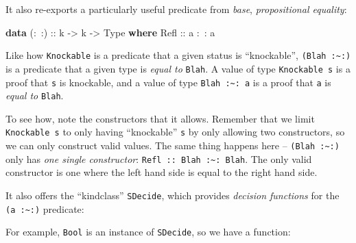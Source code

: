 \documentclass[]{article}
\newenvironment{Shaded}{}{}
\newcommand{\DataTypeTok}[1]{\textcolor[rgb]{0.56,0.13,0.00}{#1}}
\newcommand{\FunctionTok}[1]{\textcolor[rgb]{0.02,0.16,0.49}{#1}}
\newcommand{\KeywordTok}[1]{\textcolor[rgb]{0.00,0.44,0.13}{\textbf{#1}}}
\newcommand{\NormalTok}[1]{#1}
\newcommand{\OtherTok}[1]{\textcolor[rgb]{0.00,0.44,0.13}{#1}}
\begin{document}
It also re-exports a particularly useful predicate from \emph{base},
\emph{propositional equality}:

\begin{Shaded}
\begin{Highlighting}[]
\KeywordTok{data}\OtherTok{ (:~:) ::}\NormalTok{ k }\OtherTok{->}\NormalTok{ k }\OtherTok{->} \DataTypeTok{Type} \KeywordTok{where}
    \DataTypeTok{Refl}\OtherTok{ ::}\NormalTok{ a }\FunctionTok{:~:}\NormalTok{ a}
\end{Highlighting}
\end{Shaded}

Like how \texttt{Knockable} is a predicate that a given status is ``knockable'',
\texttt{(\textquotesingle{}Blah\ :\textasciitilde{}:)} is a predicate that a
given type is \emph{equal to} \texttt{\textquotesingle{}Blah}. A value of type
\texttt{Knockable\ s} is a proof that \texttt{s} is knockable, and a value of
type \texttt{\textquotesingle{}Blah\ :\textasciitilde{}:\ a} is a proof that
\texttt{a} is \emph{equal to} \texttt{\textquotesingle{}Blah}.

To see how, note the constructors that it allows. Remember that we limit
\texttt{Knockable\ s} to only having ``knockable'' \texttt{s} by only allowing
two constructors, so we can only construct valid values. The same thing happens
here -- \texttt{(\textquotesingle{}Blah\ :\textasciitilde{}:)} only has
\emph{one single constructor}:
\texttt{Refl\ ::\ \textquotesingle{}Blah\ :\textasciitilde{}:\ \textquotesingle{}Blah}.
The only valid constructor is one where the left hand side is equal to the right
hand side.

It also offers the ``kindclass'' \texttt{SDecide}, which provides \emph{decision
functions} for the \texttt{(a\ :\textasciitilde{}:)} predicate:

\begin{Shaded}
\end{Shaded}

For example, \texttt{Bool} is an instance of \texttt{SDecide}, so we have a
function:
\end{document}
